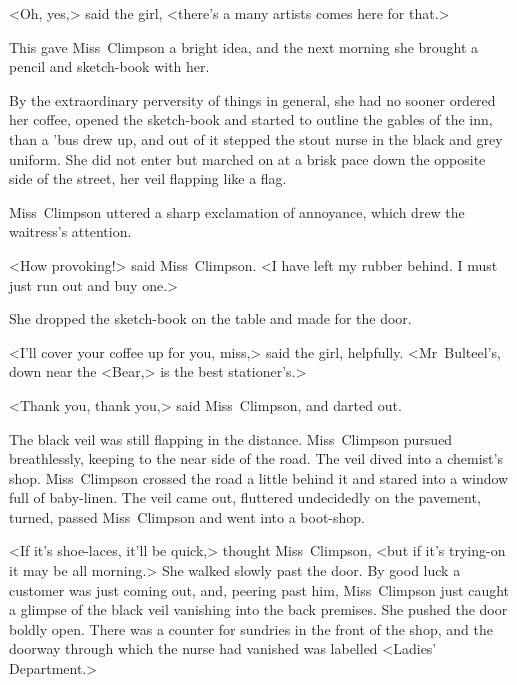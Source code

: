 <Oh, yes,> said the girl, <there's a many artists comes here for that.>

This gave Miss~Climpson a bright idea, and the next morning she brought a pencil and sketch-book with her.

By the extraordinary perversity of things in general, she had no sooner ordered her coffee, opened the sketch-book and started to outline the gables of the inn, than a 'bus drew up, and out of it stepped the stout nurse in the black and grey uniform. She did not enter  but marched on at a brisk pace down the opposite side of the street, her veil flapping like a flag.

Miss~Climpson uttered a sharp exclamation of annoyance, which drew the waitress's attention.

<How provoking!> said Miss~Climpson. <I have left my rubber behind. I must just run out and buy one.>

She dropped the sketch-book on the table and made for the door.

<I'll cover your coffee up for you, miss,> said the girl, helpfully. <Mr~Bulteel's, down near the <Bear,> is the best stationer's.>

<Thank you, thank you,> said Miss~Climpson, and darted out.

The black veil was still flapping in the distance. Miss~Climpson pursued breathlessly, keeping to the near side of the road. The veil dived into a chemist's shop. Miss~Climpson crossed the road a little behind it and stared into a window full of baby-linen. The veil came out, fluttered undecidedly on the pavement, turned, passed Miss~Climpson and went into a boot-shop.

<If it's shoe-laces, it'll be quick,> thought Miss~Climpson, <but if it's trying-on it may be all morning.> She walked slowly past the door. By good luck a customer was just coming out, and, peering past him, Miss~Climpson just caught a glimpse of the black veil vanishing into the back premises. She pushed the door boldly open. There was a counter for sundries in the front of the shop, and the doorway through which the nurse had vanished was labelled <Ladies' Department.>

